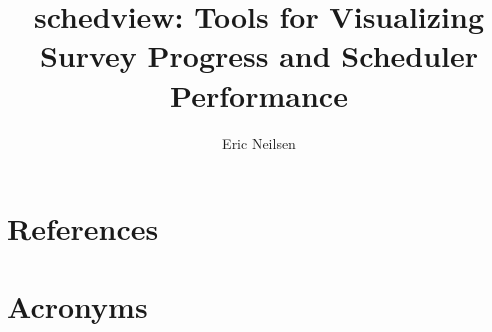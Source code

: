 \documentclass[OPS,lsstdraft,authoryear,toc]{lsstdoc}
\title{schedview: Tools for Visualizing Survey Progress and Scheduler Performance}
\author{%
Eric Neilsen
}
\date{\vcsDate}
\begin{document}
\maketitle


\appendix
\section{References} \label{sec:bib}
\renewcommand{\refname}{} %


\section{Acronyms} \label{sec:acronyms}

\end{document}
